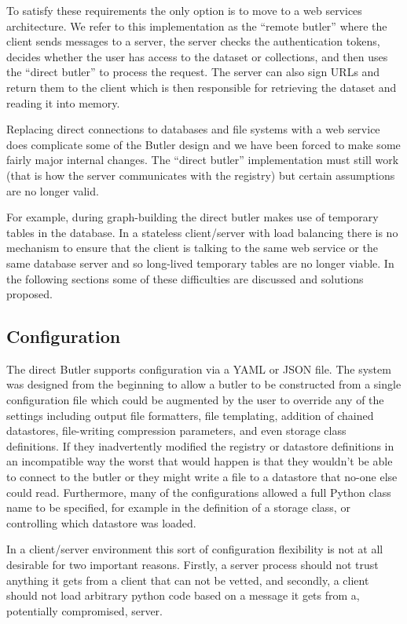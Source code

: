 To satisfy these requirements the only option is to move to a web services architecture.
We refer to this implementation as the ``remote butler'' where the client sends messages to a server, the server checks the authentication tokens, decides whether the user has access to the dataset or collections, and then uses the ``direct butler'' to process the request.
The server can also sign URLs and return them to the client which is then responsible for retrieving the dataset and reading it into memory.

Replacing direct connections to databases and file systems with a web service does complicate some of the Butler design and we have been forced to make some fairly major internal changes.
The ``direct butler'' implementation must still work (that is how the server communicates with the registry) but certain assumptions are no longer valid.

For example, during graph-building the direct butler makes use of temporary tables in the database.
In a stateless client/server with load balancing there is no mechanism to ensure that the client is talking to the same web service or the same database server and so long-lived temporary tables are no longer viable.
In the following sections some of these difficulties are discussed and solutions proposed.

\subsection{Configuration}

The direct Butler supports configuration via a YAML or JSON file.
The system was designed from the beginning to allow a butler to be constructed from a single configuration file which could be augmented by the user to override any of the settings including output file formatters, file templating, addition of chained datastores, file-writing compression parameters, and even storage class definitions.
If they inadvertently modified the registry or datastore definitions in an incompatible way the worst that would happen is that they wouldn't be able to connect to the butler or they might write a file to a datastore that no-one else could read.
Furthermore, many of the configurations allowed a full Python class name to be specified, for example in the definition of a storage class, or controlling which datastore was loaded.

In a client/server environment this sort of configuration flexibility is not at all desirable for two important reasons.
Firstly, a server process should not trust anything it gets from a client that can not be vetted, and secondly, a client should not load arbitrary python code based on a message it gets from a, potentially compromised, server.

